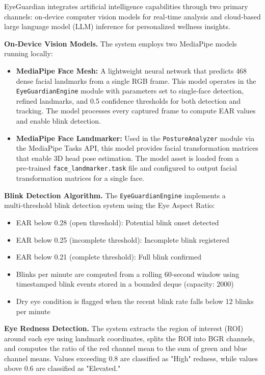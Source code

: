 \documentclass[12pt]{report}
\begin{document}
EyeGuardian integrates artificial intelligence capabilities through two primary channels: on‑device computer vision models for real‑time analysis and cloud‑based large language model (LLM) inference for personalized wellness insights.

\textbf{On‑Device Vision Models.} The system employs two MediaPipe models running locally:

\begin{itemize}
    \item \textbf{MediaPipe Face Mesh:} A lightweight neural network that predicts 468 dense facial landmarks from a single RGB frame. This model operates in the \texttt{EyeGuardianEngine} module with parameters set to single‑face detection, refined landmarks, and 0.5 confidence thresholds for both detection and tracking. The model processes every captured frame to compute EAR values and enable blink detection.
    \item \textbf{MediaPipe Face Landmarker:} Used in the \texttt{PostureAnalyzer} module via the MediaPipe Tasks API, this model provides facial transformation matrices that enable 3D head pose estimation. The model asset is loaded from a pre‑trained \texttt{face\_landmarker.task} file and configured to output facial transformation matrices for a single face.
\end{itemize}

\textbf{Blink Detection Algorithm.} The \texttt{EyeGuardianEngine} implements a multi‑threshold blink detection system using the Eye Aspect Ratio:

\begin{itemize}
    \item EAR below 0.28 (open threshold): Potential blink onset detected
    \item EAR below 0.25 (incomplete threshold): Incomplete blink registered
    \item EAR below 0.21 (complete threshold): Full blink confirmed
    \item Blinks per minute are computed from a rolling 60‑second window using timestamped blink events stored in a bounded deque (capacity: 2000)
    \item Dry eye condition is flagged when the recent blink rate falls below 12 blinks per minute
\end{itemize}

\textbf{Eye Redness Detection.} The system extracts the region of interest (ROI) around each eye using landmark coordinates, splits the ROI into BGR channels, and computes the ratio of the red channel mean to the sum of green and blue channel means. Values exceeding 0.8 are classified as "High" redness, while values above 0.6 are classified as "Elevated."
\end{document}
